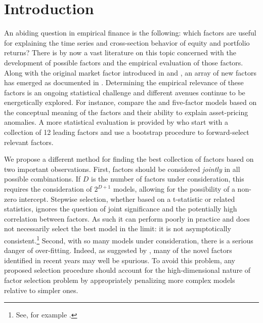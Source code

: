 \section{Introduction}
An abiding question in empirical finance is the following: which factors are useful for explaining the time series and cross-section behavior of equity and portfolio returns? 
There is by now a vast literature on this topic concerned with the development of possible factors and the empirical evaluation of those factors. 
Along with the original market factor introduced in \cite{sharpe1964capital} and \cite{lintner1965valuation}, an array of new factors has emerged as documented in \cite{harvey2015and}. 
Determining the empirical relevance of these factors is an ongoing statistical challenge and different avenues continue to be energetically explored. 
For instance, \cite{hou2014comparison} compare the \cite{hou2014digesting} and \cite{fama2015five} five-factor models based on the conceptual meaning of the factors and their ability to explain asset-pricing anomalies.
A more statistical evaluation is provided by \cite{harvey2015lucky} who start with a collection of 12 leading factors and use a bootstrap procedure to forward-select relevant factors. 

We propose a different method for finding the best collection of factors based on two important observations.
First, factors should be considered \emph{jointly} in all possible combinations. 
If $D$ is the number of factors under consideration, this requires the consideration of $2^{D+1}$ models, allowing for the possibility of a non-zero intercept.
Stepwise selection, whether based on a t-statistic or related statistics, ignores the question of joint significance and the potentially high correlation between factors.
As such it can perform poorly in practice and does not necessarily select the best model in the limit: it is not asymptotically consistent.\footnote{See, for example \cite{judd2011data}.}
Second, with so many models under consideration, there is a serious danger of over-fitting.
Indeed, as suggested by \cite{harvey2015and}, many of the novel factors identified in recent years may well be spurious.
To avoid this problem, any proposed selection procedure should account for the high-dimensional nature of factor selection problem by appropriately penalizing more complex models relative to simpler ones.

